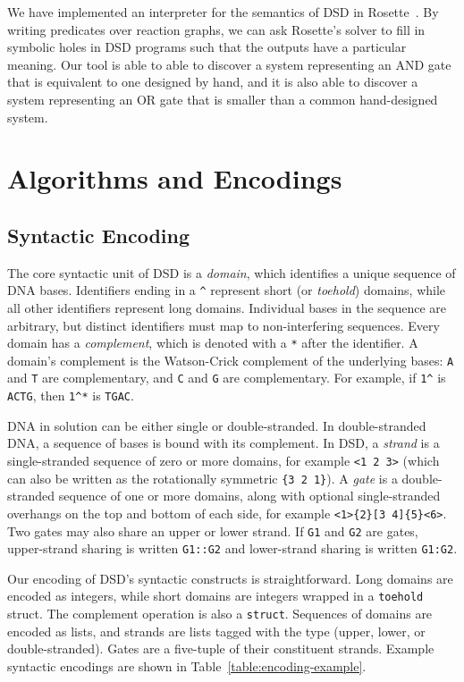 \documentclass{article}[10pt]
\begin{document}
We have implemented an interpreter for the semantics of DSD in
Rosette~\cite{rosette}. By writing predicates over reaction graphs, we can ask
Rosette's solver to fill in symbolic holes in DSD programs such that the outputs
have a particular meaning.  Our tool is able to able to discover a system
representing an AND gate that is equivalent to one designed by hand, and it is
also able to discover a system representing an OR gate that is smaller than a
common hand-designed system.

\section{Algorithms and Encodings}

\subsection{Syntactic Encoding}

The core syntactic unit of DSD is a \emph{domain}, which identifies
a unique sequence of DNA bases.  Identifiers ending
in a \lstinline{^} represent short (or \emph{toehold}) domains,
while all other identifiers represent long domains.
Individual bases in the sequence are arbitrary, but distinct identifiers must
map to non-interfering sequences.
Every domain has a \emph{complement}, which is denoted
with a \lstinline{*} after the identifier. A domain's complement is
the Watson-Crick complement of the underlying bases: \lstinline{A} and \lstinline{T}
are complementary, and \lstinline{C} and \lstinline{G} are complementary.  
For example, if \lstinline{1^} is \lstinline{ACTG}, then \lstinline{1^*}
is \lstinline{TGAC}.

DNA in solution can be either single or double-stranded.
In double-stranded DNA, a sequence of bases is bound with its complement.
In DSD, a \emph{strand} is a single-stranded sequence of zero or more domains, for
example \verb;<1 2 3>; (which can also be written as the rotationally symmetric
\verb;{3 2 1};).
A \emph{gate} is a double-stranded sequence of one or more domains,
along with optional single-stranded overhangs on the top and bottom of each
side, for example \verb;<1>{2}[3 4]{5}<6>;.
Two gates may also share an upper or lower strand. If \verb;G1; and \verb;G2;
are gates, upper-strand sharing is written \verb;G1::G2; and lower-strand
sharing is written \verb;G1:G2;.

Our encoding of DSD's syntactic constructs is straightforward.
Long domains are encoded as integers, while
short domains are integers wrapped in a \verb;toehold; struct.
The complement operation is also a \verb;struct;.
Sequences of domains are encoded as lists, and strands are lists
tagged with the type (upper, lower, or double-stranded). Gates
are a five-tuple of their constituent strands.
Example syntactic encodings are shown in Table~\ref{table:encoding-example}.
\end{document}
